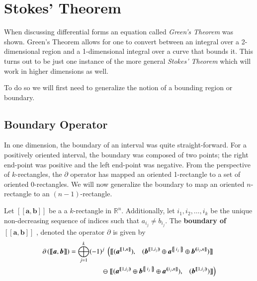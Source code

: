 %
%
\chapter{Stokes' Theorem}

When discussing differential forms an equation called \emph{Green's Theorem} was shown. 
Green's Theorem allows for one to convert between an integral over a 2-dimensional region and a 1-dimensional integral
over a curve that bounds it.
This turns out to be just one instance of the more general \emph{Stokes' Theorem} 
which will work in higher dimensions as well.


To do so we will first need to generalize the notion of a bounding region or boundary.



\section{Boundary Operator}


In one dimension, the boundary of an interval was quite straight-forward.
For a positively oriented interval, the boundary was composed of two points; 
the right end-point was positive and the left end-point was negative.
From the perspective of $k$-rectangles, 
the $\partial$ operator has mapped an oriented 1-rectangle to a set of oriented 0-rectangles.
We will now generalize the boundary to map an oriented $n$-rectangle to an $(n-1)$-rectangle.


\begin{definition}
	Let  $[\![\boldsymbol{a}, \boldsymbol{b}]\!]$ be a a $k$-rectangle in $\mathbb{R}^n$.
	Additionally, let $i_1, i_2, \ldots, i_k$ be the unique non-decreasing sequence of indices such that $a_{i_j} \neq b_{i_j}$.
	The \textbf{boundary of $ \boldsymbol{[\![ a,b ]\!]} $ }, denoted the operator $\partial$ is given by
	\begin{align}
		\partial \left( [\![ \boldsymbol{a}, \boldsymbol{b} ]\!] \right) 
		= \bigoplus_{j=1}^k (-1)^j \;
			\left(	
				[\![ 	(\boldsymbol{a}^{[\![1,n]\!]}), 
					\;\;\;
					(\boldsymbol{b}^{[\![1,i_j)\!)} 
						\oplus \boldsymbol{a}^{\hset{i_j}}
						\oplus \boldsymbol{b}^{(\!(i_j,n]\!]}) 
				]\!] \right.\;
			\notag\\
			\ominus \left.
				[\![ 	(\boldsymbol{a}^{[\![1,i_j)\!)}
						\oplus \boldsymbol{b}^{\hset{i_j}}
						\oplus \boldsymbol{a}^{(\!(i_j, n]\!]}), 
					\;\;\;		 
					(\boldsymbol{b}^{[\![1,i_j)\!)}) 			
				]\!]
			\right)
	\end{align}
\end{definition}


